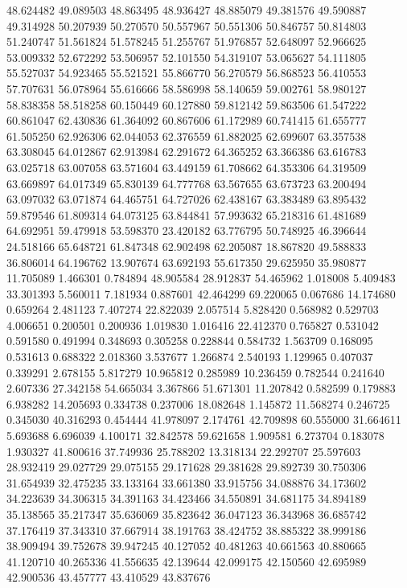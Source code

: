 48.624482
49.089503
48.863495
48.936427
48.885079
49.381576
49.590887
49.314928
50.207939
50.270570
50.557967
50.551306
50.846757
50.814803
51.240747
51.561824
51.578245
51.255767
51.976857
52.648097
52.966625
53.009332
52.672292
53.506957
52.101550
54.319107
53.065627
54.111805
55.527037
54.923465
55.521521
55.866770
56.270579
56.868523
56.410553
57.707631
56.078964
55.616666
58.586998
58.140659
59.002761
58.980127
58.838358
58.518258
60.150449
60.127880
59.812142
59.863506
61.547222
60.861047
62.430836
61.364092
60.867606
61.172989
60.741415
61.655777
61.505250
62.926306
62.044053
62.376559
61.882025
62.699607
63.357538
63.308045
64.012867
62.913984
62.291672
64.365252
63.366386
63.616783
63.025718
63.007058
63.571604
63.449159
61.708662
64.353306
64.319509
63.669897
64.017349
65.830139
64.777768
63.567655
63.673723
63.200494
63.097032
63.071874
64.465751
64.727026
62.438167
63.383489
63.895432
59.879546
61.809314
64.073125
63.844841
57.993632
65.218316
61.481689
64.692951
59.479918
53.598370
23.420182
63.776795
50.748925
46.396644
24.518166
65.648721
61.847348
62.902498
62.205087
18.867820
49.588833
36.806014
64.196762
13.907674
63.692193
55.617350
29.625950
35.980877
11.705089
1.466301
0.784894
48.905584
28.912837
54.465962
1.018008
5.409483
33.301393
5.560011
7.181934
0.887601
42.464299
69.220065
0.067686
14.174680
0.659264
2.481123
7.407274
22.822039
2.057514
5.828420
0.568982
0.529703
4.006651
0.200501
0.200936
1.019830
1.016416
22.412370
0.765827
0.531042
0.591580
0.491994
0.348693
0.305258
0.228844
0.584732
1.563709
0.168095
0.531613
0.688322
2.018360
3.537677
1.266874
2.540193
1.129965
0.407037
0.339291
2.678155
5.817279
10.965812
0.285989
10.236459
0.782544
0.241640
2.607336
27.342158
54.665034
3.367866
51.671301
11.207842
0.582599
0.179883
6.938282
14.205693
0.334738
0.237006
18.082648
1.145872
11.568274
0.246725
0.345030
40.316293
0.454444
41.978097
2.174761
42.709898
60.555000
31.664611
5.693688
6.696039
4.100171
32.842578
59.621658
1.909581
6.273704
0.183078
1.930327
41.800616
37.749936
25.788202
13.318134
22.292707
25.597603
28.932419
29.027729
29.075155
29.171628
29.381628
29.892739
30.750306
31.654939
32.475235
33.133164
33.661380
33.915756
34.088876
34.173602
34.223639
34.306315
34.391163
34.423466
34.550891
34.681175
34.894189
35.138565
35.217347
35.636069
35.823642
36.047123
36.343968
36.685742
37.176419
37.343310
37.667914
38.191763
38.424752
38.885322
38.999186
38.909494
39.752678
39.947245
40.127052
40.481263
40.661563
40.880665
41.120710
40.265336
41.556635
42.139644
42.099175
42.150560
42.695989
42.900536
43.457777
43.410529
43.837676
